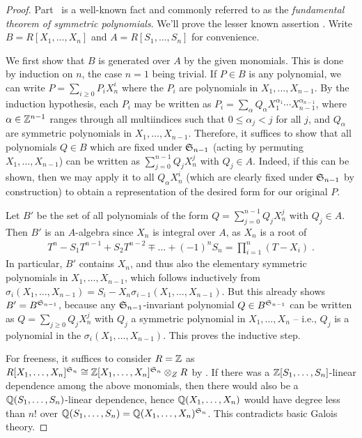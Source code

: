 \documentclass[a4paper,parskip=half,numbers=enddot, DIV=12]{scrreprt}
\renewcommand{\geq}{\geqslant}
\renewcommand{\leq}{\leqslant}
\begin{document}
\begin{proof}
	Part~ is a well-known fact and commonly referred to as the \emph{fundamental theorem of symmetric polynomials}. We'll prove the lesser known assertion . Write $B=R[X_1,\ldots,X_n]$ and $A=R[S_1,\ldots,S_n]$ for convenience.
	
	We first show that $B$ is generated over $A$ by the given monomials. This is done by induction on $n$, the case $n=1$ being trivial. If $P\in B$ is any polynomial, we can write $P=\sum_{i\geq 0}P_iX_n^i$ where the $P_i$ are polynomials in $X_1,\ldots,X_{n-1}$. By the induction hypothesis, each $P_i$ may be written as $P_i=\sum_\alpha Q_\alpha X_1^{\alpha_1}\cdots X_{n-1}^{\alpha_{n-1}}$, where $\alpha\in\mathbb{Z}^{n-1}$ ranges through all multiindices such that $0\leq \alpha_j<j$ for all $j$, and $Q_\alpha$ are symmetric polynomials in $X_1,\ldots,X_{n-1}$. Therefore, it suffices to show that all polynomials $Q\in B$ which are fixed under $\mathfrak{S}_{n-1}$ (acting by permuting $X_1,\ldots,X_{n-1}$) can be written as $\sum_{j=0}^{n-1}Q_jX_n^j$ with $Q_j\in A$. Indeed, if this can be shown, then we may apply it to all $Q_\alpha X_n^i$ (which are clearly fixed under $\mathfrak{S}_{n-1}$ by construction) to obtain a representation of the desired form for our original $P$.
	
	Let $B'$ be the set of all polynomials of the form $Q=\sum_{j=0}^{n-1}Q_jX_n^j$ with $Q_j\in A$. Then $B'$ is an $A$-algebra since $X_n$ is integral over $A$, as $X_n$ is a root of
	\begin{align*}
		T^n-S_1T^{n-1}+S_2T^{n-2}\mp\ldots +(-1)^nS_n=\prod_{i=1}^n(T-X_i)\;.
	\end{align*}
	In particular, $B'$ contains $X_n$, and thus also the elementary symmetric polynomials in $X_1,\ldots,X_{n-1}$, which follows inductively from $\sigma_i(X_1,\ldots,X_{n-1})=S_i-X_n\sigma_{i-1}(X_1,\ldots,X_{n-1})$. But this already shows $B'=B^{\mathfrak{S}_{n-1}}$, because any $\mathfrak{S}_{n-1}$-invariant polynomial $Q\in B^{\mathfrak{S}_{n-1}}$ can be written as $Q=\sum_{j\geq 0}Q_jX_n^j$ with $Q_j$ a symmetric polynomial in $X_1,\ldots,X_n$ -- i.e., $Q_j$ is a polynomial in the $\sigma_i(X_1,\ldots,X_{n-1})$. This proves the inductive step.
	
	For freeness, it suffices to consider $R=\mathbb{Z}$ as $R[X_1,\ldots,X_n]^{\mathfrak{S}_n}\cong \mathbb{Z}[X_1,\ldots,X_n]^{\mathfrak{S}_n}\otimes_ZR$ by . If there was a $\mathbb{Z}[S_1,\ldots,S_n]$-linear dependence among the above monomials, then there would also be a $\mathbb{Q}(S_1,\ldots,S_n)$-linear dependence, hence $\mathbb{Q}(X_1,\ldots,X_n)$ would have degree less than $n!$ over $\mathbb{Q}(S_1,\ldots,S_n)=\mathbb{Q}(X_1,\ldots,X_n)^{\mathfrak{S}_n}$. This contradicts basic Galois theory.
\end{proof}
\end{document}
